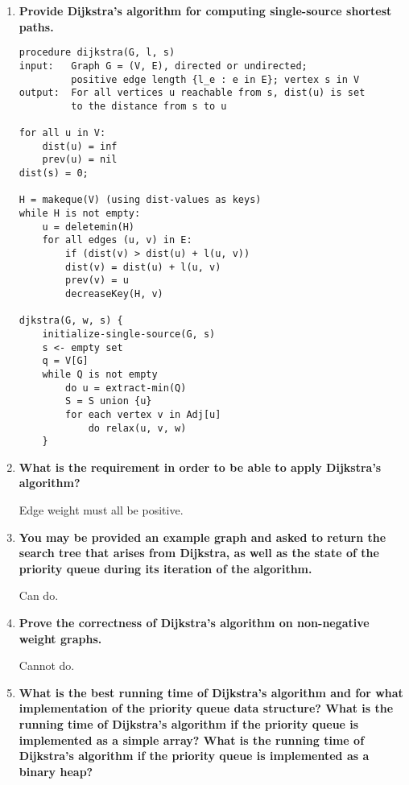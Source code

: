 \documentclass[a4paper,11pt]{article}
\begin{document}
\begin{enumerate}
\def\labelenumi{\arabic{enumi}.}
\item
  \textbf{Provide Dijkstra's algorithm for computing single-source
  shortest paths.}

\begin{verbatim}
procedure dijkstra(G, l, s)
input:   Graph G = (V, E), directed or undirected;
         positive edge length {l_e : e in E}; vertex s in V
output:  For all vertices u reachable from s, dist(u) is set
         to the distance from s to u

for all u in V:
    dist(u) = inf
    prev(u) = nil
dist(s) = 0;

H = makeque(V) (using dist-values as keys)
while H is not empty:
    u = deletemin(H)
    for all edges (u, v) in E:
        if (dist(v) > dist(u) + l(u, v))
        dist(v) = dist(u) + l(u, v)
        prev(v) = u
        decreaseKey(H, v)

djkstra(G, w, s) {
    initialize-single-source(G, s)
    s <- empty set
    q = V[G]
    while Q is not empty
        do u = extract-min(Q)
        S = S union {u}
        for each vertex v in Adj[u]
            do relax(u, v, w)
    }
\end{verbatim}
\item
  \textbf{What is the requirement in order to be able to apply
  Dijkstra's algorithm?}

  Edge weight must all be positive.
\item
  \textbf{You may be provided an example graph and asked to return the
  search tree that arises from Dijkstra, as well as the state of the
  priority queue during its iteration of the algorithm.}

  Can do.
\item
  \textbf{Prove the correctness of Dijkstra's algorithm on non-negative
  weight graphs.}

  Cannot do.
\item
  \textbf{What is the best running time of Dijkstra's algorithm and for
  what implementation of the priority queue data structure? What is the
  running time of Dijkstra's algorithm if the priority queue is
  implemented as a simple array? What is the running time of Dijkstra's
  algorithm if the priority queue is implemented as a binary heap?}


\end{enumerate}
\end{document}
